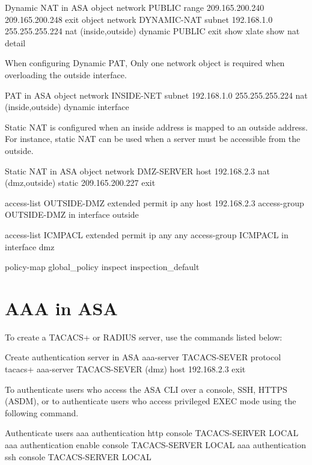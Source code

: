 \begin{sexylisting}{Dynamic NAT in ASA}
object network PUBLIC
	range 209.165.200.240 209.165.200.248
	exit
object network DYNAMIC-NAT
	subnet 192.168.1.0 255.255.255.224
	nat (inside,outside) dynamic PUBLIC
	exit
show xlate
show nat detail	
\end{sexylisting}

When configuring Dynamic PAT, Only one network object is required when overloading the outside interface. 

\begin{sexylisting}{PAT in ASA}
object network INSIDE-NET
	subnet 192.168.1.0 255.255.255.224
	nat (inside,outside) dynamic interface
\end{sexylisting}

Static NAT is configured when an inside address is mapped to an outside address. For instance, static NAT can be used when a server must be accessible from the outside. 

\begin{sexylisting}{Static NAT in ASA}
object network DMZ-SERVER
	host 192.168.2.3
	nat (dmz,outside) static 209.165.200.227
	exit
	
access-list OUTSIDE-DMZ extended permit ip any host 192.168.2.3
access-group OUTSIDE-DMZ in interface outside

access-list ICMPACL extended permit ip any any
access-group ICMPACL in interface dmz

policy-map global_policy
	inspect inspection_default
\end{sexylisting}


\section{AAA in ASA}

To create a TACACS+ or RADIUS server, use the commands listed below:

\begin{sexylisting}{Create authentication server in ASA}
aaa-server TACACS-SEVER protocol tacacs+
	aaa-server TACACS-SEVER (dmz) host 192.168.2.3
	exit
\end{sexylisting}

To authenticate users who access the ASA CLI over a console, SSH, HTTPS (ASDM), or to authenticate users who access privileged EXEC mode using the following command.

\begin{sexylisting}{Authenticate users}
aaa authentication http console TACACS-SERVER LOCAL
aaa authentication enable console TACACS-SERVER LOCAL
aaa authentication ssh console TACACS-SERVER LOCAL
\end{sexylisting}


